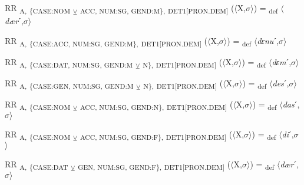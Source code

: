 {\begin{exe}
 RR \textsubscript{A,} \textsubscript{\{CASE:NOM} \textsubscript{${\veebar}$}\textsubscript{ ACC, NUM:SG, GEND:M\},} \textsubscript{DET1[PRON.DEM]} ($\langle$X,$\sigma $$\rangle$) = \textsubscript{def} $\langle$\textit{dær}ˊ,$\sigma $$\rangle$
\end{exe}

\begin{exe}
 RR \textsubscript{A,} \textsubscript{\{CASE:ACC, NUM:SG, GEND:M\},} \textsubscript{DET1[PRON.DEM]} ($\langle$X,$\sigma $$\rangle$) = \textsubscript{def} $\langle$\textit{dɛnu}ˊ,$\sigma $$\rangle$
\end{exe}

\begin{exe}
 RR \textsubscript{A,} \textsubscript{\{CASE:DAT, NUM:SG, GEND:M} \textsubscript{${\veebar}$}\textsubscript{ N\},} \textsubscript{DET1[PRON.DEM]} ($\langle$X,$\sigma $$\rangle$) = \textsubscript{def} $\langle$\textit{dɛm}ˊ,$\sigma $$\rangle$
\end{exe}

\begin{exe}
 RR \textsubscript{A,} \textsubscript{\{CASE:GEN, NUM:SG, GEND:M} \textsubscript{${\veebar}$}\textsubscript{ N\},} \textsubscript{DET1[PRON.DEM]} ($\langle$X,$\sigma $$\rangle$) = \textsubscript{def} $\langle$\textit{des}ˊ,$\sigma $$\rangle$
\end{exe}

\begin{exe}
 RR \textsubscript{A,} \textsubscript{\{CASE:NOM} \textsubscript{${\veebar}$}\textsubscript{ ACC, NUM:SG, GEND:N\},} \textsubscript{DET1[PRON.DEM]} ($\langle$X,$\sigma $$\rangle$) = \textsubscript{def} $\langle$\textit{das}ˊ,$\sigma $$\rangle$
\end{exe}

\begin{exe}
 RR \textsubscript{A,} \textsubscript{\{CASE:NOM} \textsubscript{${\veebar}$}\textsubscript{ ACC, NUM:SG, GEND:F\},} \textsubscript{DET1[PRON.DEM]} ($\langle$X,$\sigma $$\rangle$) = \textsubscript{def} $\langle$\textit{di}ˊ,$\sigma $$\rangle$
\end{exe}

\begin{exe}
 RR \textsubscript{A,} \textsubscript{\{CASE:DAT} \textsubscript{${\veebar}$}\textsubscript{ GEN, NUM:SG, GEND:F\},} \textsubscript{DET1[PRON.DEM]} ($\langle$X,$\sigma $$\rangle$) = \textsubscript{def} $\langle$\textit{dær}ˊ,$\sigma $$\rangle$
\end{exe}

}
